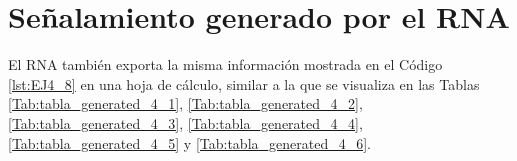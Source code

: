 \section{Señalamiento generado por el RNA}

    El RNA también exporta la misma información mostrada en el Código \ref{lst:EJ4_8} en una hoja de cálculo, similar a la que se visualiza en las Tablas \ref{Tab:tabla_generated_4_1}, \ref{Tab:tabla_generated_4_2}, \ref{Tab:tabla_generated_4_3}, \ref{Tab:tabla_generated_4_4}, \ref{Tab:tabla_generated_4_5} y \ref{Tab:tabla_generated_4_6}.

    \begin{table}[H]
        {
        \caption{Tabla de enclavamiento del ejemplo 4 generada por el RNA (Rutas 1 a 15).}
        \label{Tab:tabla_generated_4_1}
        \centering
        }
\end{table}
